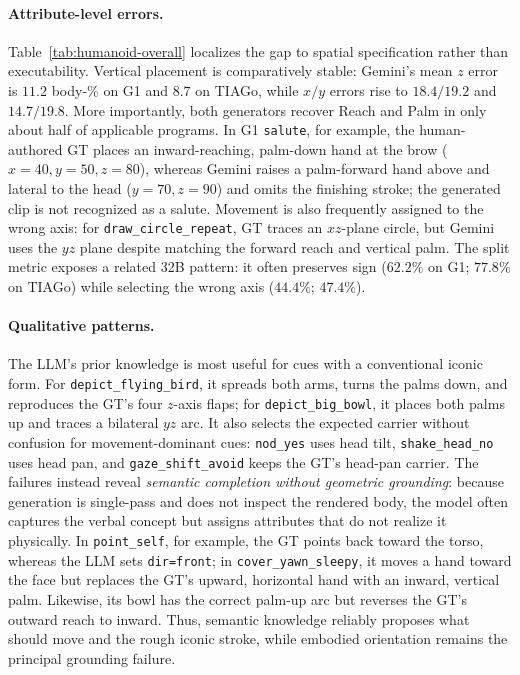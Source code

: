 \documentclass[letterpaper,10pt,conference]{ieeeconf}
\begin{document}


\paragraph{Attribute-level errors.} Table~\ref{tab:humanoid-overall} localizes the gap to spatial specification rather than executability. Vertical placement is comparatively stable: Gemini's mean $z$ error is $11.2$ body-\% on G1 and $8.7$ on TIAGo, while $x/y$ errors rise to $18.4/19.2$ and $14.7/19.8$. More importantly, both generators recover Reach and Palm in only about half of applicable programs. In G1 \texttt{salute}, for example, the human-authored GT places an inward-reaching, palm-down hand at the brow ($x{=}40,y{=}50,z{=}80$), whereas Gemini raises a palm-forward hand above and lateral to the head ($y{=}70,z{=}90$) and omits the finishing stroke; the generated clip is not recognized as a salute. Movement is also frequently assigned to the wrong axis: for \texttt{draw\_circle\_repeat}, GT traces an $xz$-plane circle, but Gemini uses the $yz$ plane despite matching the forward reach and vertical palm. The split metric exposes a related 32B pattern: it often preserves sign ($62.2\%$ on G1; $77.8\%$ on TIAGo) while selecting the wrong axis ($44.4\%$; $47.4\%$).

\paragraph{Qualitative patterns.} The LLM's prior knowledge is most useful for cues with a conventional iconic form. For \texttt{depict\_flying\_bird}, it spreads both arms, turns the palms down, and reproduces the GT's four $z$-axis flaps; for \texttt{depict\_big\_bowl}, it places both palms up and traces a bilateral $yz$ arc. It also selects the expected carrier without confusion for movement-dominant cues: \texttt{nod\_yes} uses head tilt, \texttt{shake\_head\_no} uses head pan, and \texttt{gaze\_shift\_avoid} keeps the GT's head-pan carrier. The failures instead reveal \emph{semantic completion without geometric grounding}: because generation is single-pass and does not inspect the rendered body, the model often captures the verbal concept but assigns attributes that do not realize it physically. In \texttt{point\_self}, for example, the GT points back toward the torso, whereas the LLM sets \texttt{dir=front}; in \texttt{cover\_yawn\_sleepy}, it moves a hand toward the face but replaces the GT's upward, horizontal hand with an inward, vertical palm. Likewise, its bowl has the correct palm-up arc but reverses the GT's outward reach to inward. Thus, semantic knowledge reliably proposes what should move and the rough iconic stroke, while embodied orientation remains the principal grounding failure.
\end{document}
